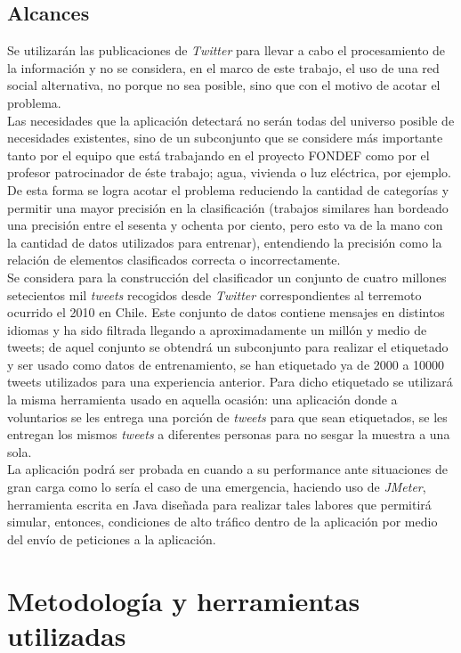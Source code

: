 \subsection{Alcances}
Se utilizarán las publicaciones de \textit{Twitter} para llevar a cabo el procesamiento de la información y no se considera, en el marco de este trabajo, el uso de una red social alternativa, no porque no sea posible, sino que con el motivo de acotar el problema.\\
Las necesidades que la aplicación detectará no serán todas del universo posible de necesidades existentes, sino de un subconjunto que se considere más importante tanto por el equipo que está trabajando en el proyecto FONDEF como por el profesor patrocinador de éste trabajo; agua, vivienda o luz eléctrica, por ejemplo. De esta forma se logra acotar el problema reduciendo la cantidad de categorías y permitir una mayor precisión en la clasificación (trabajos similares han bordeado una precisión entre el sesenta y ochenta por ciento, pero esto va de la mano con la cantidad de datos utilizados para entrenar), entendiendo la precisión como la relación de elementos clasificados correcta o incorrectamente.\\
Se considera para la construcción del clasificador un conjunto de cuatro millones setecientos mil \textit{tweets} recogidos desde \textit{Twitter} correspondientes al terremoto ocurrido el 2010 en Chile. Este conjunto de datos contiene mensajes en distintos idiomas y ha sido filtrada llegando a aproximadamente un millón y medio de tweets; de aquel conjunto se obtendrá un subconjunto para realizar el etiquetado y ser usado como datos de entrenamiento, se han etiquetado ya de 2000 a 10000 tweets utilizados para una experiencia anterior. Para dicho etiquetado se utilizará la misma herramienta usado en aquella ocasión: una aplicación donde a voluntarios se les entrega una porción de \textit{tweets} para que sean etiquetados, se les entregan los mismos \textit{tweets} a diferentes personas para no sesgar la muestra a una sola.\\
La aplicación podrá ser probada en cuando a su performance ante situaciones de gran carga como lo sería el caso de una emergencia, haciendo uso de \textit{JMeter}, herramienta escrita en Java diseñada para realizar tales labores que permitirá simular, entonces, condiciones de alto tráfico dentro de la aplicación por medio del envío de peticiones a la aplicación.



\section{Metodolog\'ia y herramientas utilizadas}
\label{intro:metodologia}

